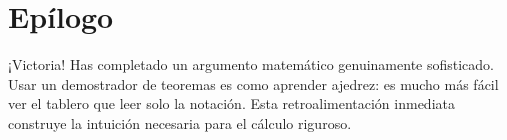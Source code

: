 \section*{Epílogo}

¡Victoria! Has completado un argumento matemático genuinamente
sofisticado. Usar un demostrador de teoremas es como aprender ajedrez:
es mucho más fácil ver el tablero que leer solo la notación. Esta
retroalimentación inmediata construye la intuición necesaria para el
cálculo riguroso.

